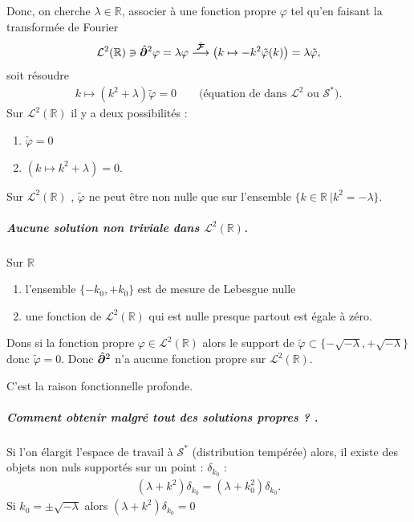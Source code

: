 Donc, on cherche $\lambda \in \mathbb R$, associer à une fonction propre $\varphi$ tel qu'en faisant la transformée de Fourier 
\begin{eqnarray}
    \mathcal L^2(\mathbb R) \ni \hat{\bm{\partial}}^2 \varphi = \lambda \varphi \overset{\hat{\bm{\mathcal F}}}{\longrightarrow} \left ( k \mapsto - k^2 \tilde \varphi (k) \right )  = \lambda \tilde \varphi,
\end{eqnarray}
soit résoudre 
\begin{eqnarray}
    k \longmapsto ( k^2 + \lambda ) \tilde \varphi = 0 \qquad \mbox{(équation de dans $\mathcal L^2$ ou $\mathcal S^\ast$)}.
\end{eqnarray}
Sur $\mathcal L^2 (\mathbb R)$ il y a deux possibilités :
\begin{enumerate}[label = \roman*)]
    \item $\tilde \varphi = 0$
    \item $ (k \mapsto k^2 + \lambda ) = 0 $.
\end{enumerate}
Sur $\mathcal L^2 (\mathbb R)$ , $\tilde \varphi$ ne peut être non nulle que sur l'ensemble $\{ k \in \mathbb R  ~\vert k^2 = -\lambda \}$.

\subparagraph{Aucune solution non triviale dans $\mathcal L^2(\mathbb R)$.}
Sur $\mathbb R$
\begin{enumerate}[label = \roman*)]
    \item l'ensemble $\{ - k_0 , + k_0 \} $ est de mesure de Lebesgue nulle
    \item une fonction de $\mathcal L^2(\mathbb R)$ qui est nulle presque partout est égale à zéro.
\end{enumerate}
Dons si la fonction propre $\varphi\in \mathcal L^2(\mathbb R)$ alors le support de $\tilde \varphi \subset \{ - \sqrt{-\lambda} , + \sqrt{-\lambda }\} $ donc $\tilde \varphi = 0 $. Donc $\hat{\bm{\partial}}^2$ n'a aucune fonction propre sur $\mathcal L^2(\mathbb R)$.\\

\smallskip

C'est la raison fonctionnelle profonde.

\subparagraph{Comment obtenir malgré tout des \guillemotleft{} solutions propres \guillemotright{}? .}

Si l'on élargit l'espace de travail à $\mathcal S^\ast$ (distribution tempérée) alors, il existe des objets non nuls supportés sur un point : $\delta_{k_0}$ :
\begin{eqnarray}
    (\lambda + k^2)\delta_{k_0} = (\lambda + k_0^2)\delta_{k_0}.
\end{eqnarray}
Si $k_0 = \pm \sqrt{-\lambda}$ alors $(\lambda + k^2)\delta_{k_0} =0$

